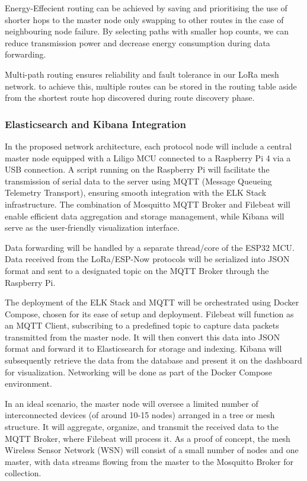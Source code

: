 Energy-Effecient routing can be achieved by saving and prioritising the use of shorter hops to the master node only swapping to other routes in the case of neighbouring node failure. By selecting paths with smaller hop counts, we can reduce transmission power and decrease energy consumption during data forwarding.

Multi-path routing ensures reliability and fault tolerance in our LoRa mesh network. to achieve this, multiple routes can be stored in the routing table aside from the shortest route hop discovered during route discovery phase.

\subsubsection{Elasticsearch and Kibana Integration}

In the proposed network architecture, each protocol node will include a central master node equipped with a Liligo MCU connected to a Raspberry Pi 4 via a USB connection. A script running on the Raspberry Pi will facilitate the transmission of serial data to the server using MQTT (Message Queueing Telemetry Transport), ensuring smooth integration with the ELK Stack infrastructure. The combination of Mosquitto MQTT Broker and Filebeat will enable efficient data aggregation and storage management, while Kibana will serve as the user-friendly visualization interface.

Data forwarding will be handled by a separate thread/core of the ESP32 MCU. Data received from the LoRa/ESP-Now protocols will be serialized into JSON format and sent to a designated topic on the MQTT Broker through the Raspberry Pi.

The deployment of the ELK Stack and MQTT will be orchestrated using Docker Compose, chosen for its ease of setup and deployment. Filebeat will function as an MQTT Client, subscribing to a predefined topic to capture data packets transmitted from the master node. It will then convert this data into JSON format and forward it to Elasticsearch for storage and indexing. Kibana will subsequently retrieve the data from the database and present it on the dashboard for visualization. Networking will be done as part of the Docker Compose environment.

In an ideal scenario, the master node will oversee a limited number of interconnected devices (of around 10-15 nodes) arranged in a tree or mesh structure. It will aggregate, organize, and transmit the received data to the MQTT Broker, where Filebeat will process it. As a proof of concept, the mesh Wireless Sensor Network (WSN) will consist of a small number of nodes and one master, with data streams flowing from the master to the Mosquitto Broker for collection.


